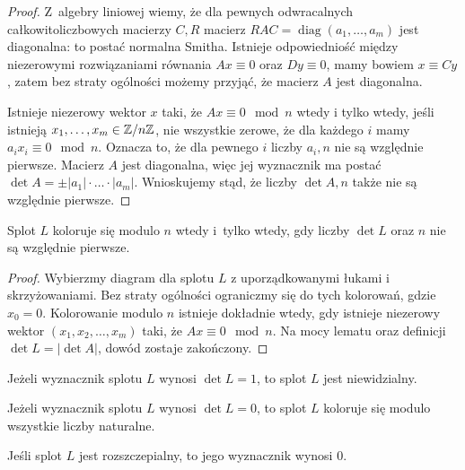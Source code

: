 \begin{proof}
    Z~algebry liniowej wiemy, że dla pewnych odwracalnych całkowitoliczbowych macierzy $C, R$ macierz $RAC = \operatorname{diag}(a_1, \ldots, a_m)$ jest diagonalna: to postać normalna Smitha.
    Istnieje odpowiedniość między niezerowymi rozwiązaniami równania $Ax \equiv 0$ oraz $Dy \equiv 0$, mamy bowiem $x \equiv Cy$, zatem bez straty ogólności możemy przyjąć, że macierz $A$ jest diagonalna.

    Istnieje niezerowy wektor $x$ taki, że $Ax \equiv 0 \mod n$ wtedy i tylko wtedy, jeśli istnieją $x_1, \ldots, x_m \in \mathbb Z/n\mathbb Z$, nie wszystkie zerowe, że dla każdego $i$ mamy $a_ix_i \equiv 0 \mod n$.
    Oznacza to, że dla pewnego $i$ liczby $a_i, n$ nie są względnie pierwsze.
    Macierz $A$ jest diagonalna, więc jej wyznacznik ma postać $\det A = \pm |a_1| \cdot \ldots \cdot |a_m|$.
    Wnioskujemy stąd, że liczby $\det A, n$ także nie są względnie pierwsze.
\end{proof}

\begin{proposition}
\label{prp:colour_determinant}%
    Splot $L$ koloruje się modulo $n$ wtedy i~tylko wtedy, gdy liczby $\det L$ oraz $n$ nie są względnie pierwsze.
\end{proposition}

\begin{proof}
    Wybierzmy diagram dla splotu $L$ z uporządkowanymi łukami i skrzyżowaniami.
    Bez straty ogólności ograniczmy się do tych kolorowań, gdzie $x_0 = 0$.
    Kolorowanie modulo $n$ istnieje dokładnie wtedy, gdy istnieje niezerowy wektor $(x_1, x_2, \ldots, x_m)$ taki, że $Ax \equiv 0 \mod n$.
    Na mocy lematu oraz definicji $\det L = |\det A|$, dowód zostaje zakończony.
\end{proof}

\begin{corollary}
%
    Jeżeli wyznacznik splotu $L$ wynosi $\det L = 1$, to splot $L$ jest niewidzialny.
\end{corollary}

\begin{corollary}
    Jeżeli wyznacznik splotu $L$ wynosi $\det L = 0$, to splot $L$ koloruje się modulo wszystkie liczby naturalne.
\end{corollary}

\begin{corollary}
%
    Jeśli splot $L$ jest rozszczepialny, to jego wyznacznik wynosi $0$.
\end{corollary}

